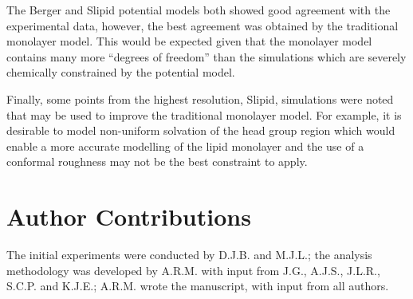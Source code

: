 \documentclass[amsmath,amssymb,twocolumn,superscriptaddress]{revtex4-1}
\begin{document}
The Berger and Slipid potential models both showed good agreement with the experimental data, however, the best agreement was obtained by the traditional monolayer model.
This would be expected given that the monolayer model contains many more ``degrees of freedom'' than the simulations which are severely chemically constrained by the potential model.

Finally, some points from the highest resolution, Slipid, simulations were noted that may be used to improve the traditional monolayer model.
For example, it is desirable to model non-uniform solvation of the head group region which would enable a more accurate modelling of the lipid monolayer and the use of a conformal roughness may not be the best constraint to apply.

\section{Author Contributions}
The initial experiments were conducted by D.J.B. and M.J.L.; the analysis methodology was developed by A.R.M. with input from J.G., A.J.S., J.L.R., S.C.P. and K.J.E.; A.R.M. wrote the manuscript, with input from all authors.



\end{document}
